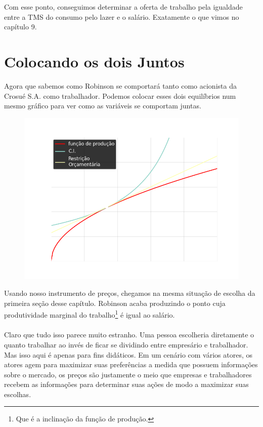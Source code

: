 \documentclass[a4paper,11pt,oneside]{book}
\theoremstyle{definition}
\theoremstyle{break}
\begin{document}
Com esse ponto, conseguimos determinar a oferta de trabalho pela igualdade entre a TMS do consumo pelo lazer e o salário. Exatamente o que vimos no capítulo 9.

\section{Colocando os dois Juntos}

Agora que sabemos como Robinson se comportará tanto como acionista da Crosué S.A. como trabalhador. Podemos colocar esses dois equilíbrios num mesmo gráfico para ver como as variáveis se comportam juntas.

\begin{figure}[H]
	\centering
	\includegraphics[scale=0.5]{cap33_5-equilibrio.png}
\end{figure}

Usando nosso instrumento de preços, chegamos na mesma situação de escolha da primeira seção desse capítulo. Robinson acaba produzindo o ponto cuja produtividade marginal do trabalho\footnote{Que é a inclinação da função de produção.} é igual ao salário.
\\
\\
Claro que tudo isso parece muito estranho. Uma pessoa escolheria diretamente o quanto trabalhar ao invés de ficar se dividindo entre empresário e trabalhador. Mas isso aqui é apenas para fins didáticos. Em um cenário com vários atores, os atores agem para maximizar suas preferências a medida que possuem informações sobre o mercado, os preços são justamente o meio que empresas e trabalhadores recebem as informações para determinar suas ações de modo a maximizar suas escolhas.
\end{document}
